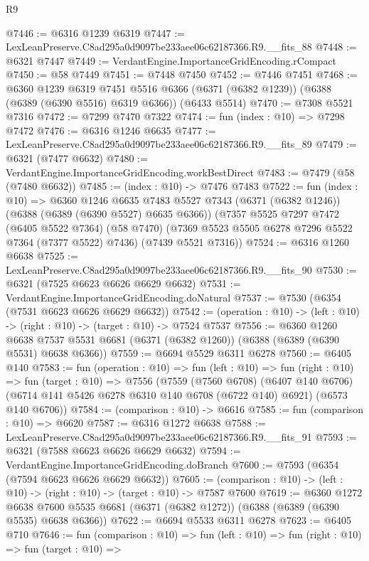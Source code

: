 \begin{lexlean}{R9}
\begin{coremodule}
@7446 := @6316 @1239 @6319
@7447 := LexLeanPreserve.C8ad295a0d9097be233aee06c62187366.R9.__fits_88
@7448 := @6321 @7447
@7449 := VerdantEngine.ImportanceGridEncoding.rCompact
@7450 := @58 @7449
@7451 := @7448 @7450
@7452 := @7446 @7451
@7468 := @6360
    @1239
    @6319
    @7451
    @5516
    @6366
    (@6371 (@6382 @1239))
    (@6388 (@6389 (@6390 @5516) @6319 @6366))
    (@6433 @5514)
@7470 := @7308 @5521 @7316
@7472 := @7299 @7470 @7322
@7474 := fun (index : @10) => @7298 @7472
@7476 := @6316 @1246 @6635
@7477 := LexLeanPreserve.C8ad295a0d9097be233aee06c62187366.R9.__fits_89
@7479 := @6321 (@7477 @6632)
@7480 := VerdantEngine.ImportanceGridEncoding.workBestDirect
@7483 := @7479 (@58 (@7480 @6632))
@7485 := (index : @10) -> @7476 @7483
@7522 := fun (index : @10) =>
  @6360
    @1246
    @6635
    @7483
    @5527
    @7343
    (@6371 (@6382 @1246))
    (@6388 (@6389 (@6390 @5527) @6635 @6366))
    (@7357
      @5525
      @7297
      @7472
      (@6405 @5522 @7364)
      (@58 @7470)
      (@7369 @5523 @5505 @6278 @7296 @5522 @7364 (@7377 @5522) @7436)
      (@7439 @5521 @7316))
@7524 := @6316 @1260 @6638
@7525 := LexLeanPreserve.C8ad295a0d9097be233aee06c62187366.R9.__fits_90
@7530 := @6321 (@7525 @6623 @6626 @6629 @6632)
@7531 := VerdantEngine.ImportanceGridEncoding.doNatural
@7537 := @7530 (@6354 (@7531 @6623 @6626 @6629 @6632))
@7542 := (operation : @10) -> (left : @10) -> (right : @10) -> (target : @10) -> @7524 @7537
@7556 := @6360
    @1260
    @6638
    @7537
    @5531
    @6681
    (@6371 (@6382 @1260))
    (@6388 (@6389 (@6390 @5531) @6638 @6366))
@7559 := @6694 @5529 @6311 @6278
@7560 := @6405 @140
@7583 := fun (operation : @10) =>
  fun (left : @10) =>
  fun (right : @10) =>
  fun (target : @10) =>
  @7556
    (@7559
      (@7560 @6708)
      (@6407 @140 @6706)
      (@6714 @141 @5426 @6278 @6310 @140 @6708 (@6722 @140) @6921)
      (@6573 @140 @6706))
@7584 := (comparison : @10) -> @6616
@7585 := fun (comparison : @10) => @6620
@7587 := @6316 @1272 @6638
@7588 := LexLeanPreserve.C8ad295a0d9097be233aee06c62187366.R9.__fits_91
@7593 := @6321 (@7588 @6623 @6626 @6629 @6632)
@7594 := VerdantEngine.ImportanceGridEncoding.doBranch
@7600 := @7593 (@6354 (@7594 @6623 @6626 @6629 @6632))
@7605 := (comparison : @10) -> (left : @10) -> (right : @10) -> (target : @10) -> @7587 @7600
@7619 := @6360
    @1272
    @6638
    @7600
    @5535
    @6681
    (@6371 (@6382 @1272))
    (@6388 (@6389 (@6390 @5535) @6638 @6366))
@7622 := @6694 @5533 @6311 @6278
@7623 := @6405 @710
@7646 := fun (comparison : @10) =>
  fun (left : @10) =>
  fun (right : @10) =>
  fun (target : @10) =>

\end{coremodule}
\end{lexlean}
